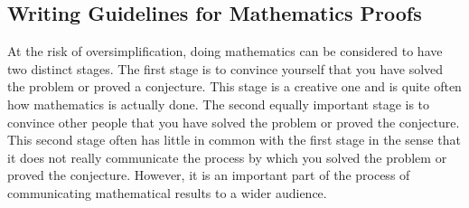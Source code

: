 \subsection*{Writing Guidelines for Mathematics Proofs}
%
At the risk of oversimplification, doing mathematics can be considered to have two distinct stages.  The first stage is to convince yourself that you have solved the problem or proved a conjecture.  This stage is a creative one and is quite often how mathematics is actually done.  The second equally important stage is to convince other people that you have solved the problem or proved the conjecture.  This second stage often has little in common with the first stage in the sense that it does not really communicate the process by which you solved the problem or proved the conjecture.   However, it is an important part of the process of communicating mathematical results to a wider audience.

